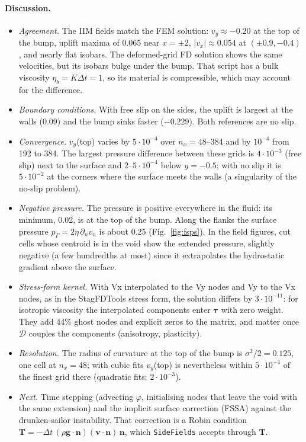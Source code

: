 \documentclass[11pt,a4paper]{article}
\newcommand{\code}[1]{\texttt{#1}}
\begin{document}
\paragraph{Discussion.}
\begin{itemize}
  \item \emph{Agreement.} The IIM fields match the FEM solution: $v_y\approx-0.20$ at the top of
    the bump, uplift maxima of 0.065 near $x=\pm2$, $|v_x|\approx0.054$ at
    $(\pm0.9,-0.4)$, and nearly flat isobars. The deformed-grid FD solution shows the same
    velocities, but its isobars bulge under the bump. That script has a bulk viscosity
    $\eta_b=K\Delta t=1$, so its material is compressible, which may account for the difference.
  \item \emph{Boundary conditions.} With free slip on the sides, the uplift is largest at the
    walls (0.09) and the bump sinks faster ($-0.229$). Both references are no slip.
  \item \emph{Convergence.} $v_y$(top) varies by $5\cdot10^{-4}$ over $n_x=48$--384 and by
    $10^{-4}$ from 192 to 384. The largest pressure difference between these grids is
    $4\cdot10^{-3}$ (free slip) next to the surface and $2$--$5\cdot10^{-4}$ below $y=-0.5$; with
    no slip it is $5\cdot10^{-2}$ at the corners where the surface meets the walls (a singularity
    of the no-slip problem).
  \item \emph{Negative pressure.} The pressure is positive everywhere in the fluid: its minimum,
    0.02, is at the top of the bump. Along the flanks the surface pressure
    $p_\Gamma=2\eta\,\partial_nv_n$ is about 0.25 (Fig.~\ref{fig:fsps}). In the field figures, cut
    cells whose centroid is in the void show the extended pressure, slightly negative
    (a few hundredths at most) since it extrapolates the hydrostatic gradient above the surface.
  \item \emph{Stress-form kernel.} With Vx interpolated to the Vy nodes and Vy to the Vx nodes, as
    in the StagFDTools stress form, the solution differs by $3\cdot10^{-11}$: for isotropic
    viscosity the interpolated components enter $\boldsymbol\tau$ with zero weight. They add 44\%
    ghost nodes and explicit zeros to the matrix, and matter once $\mathcal D$ couples the
    components (anisotropy, plasticity).
  \item \emph{Resolution.} The radius of curvature at the top of the bump is
    $\sigma^2/2=0.125$, one cell at $n_x=48$; with cubic fits $v_y$(top) is nevertheless within
    $5\cdot10^{-4}$ of the finest grid there (quadratic fits: $2\cdot10^{-3}$).
  \item \emph{Next.} Time stepping (advecting $\varphi$, initialising nodes that leave the void
    with the same extension) and the implicit surface correction (FSSA) against the drunken-sailor
    instability. That correction is a Robin condition
    $\mathbf T=-\Delta t\,(\rho\mathbf g\cdot\mathbf n)(\mathbf v\cdot\mathbf n)\,\mathbf n$, which
    \code{SideFields} accepts through $\mathbf T$.
\end{itemize}
\end{document}
